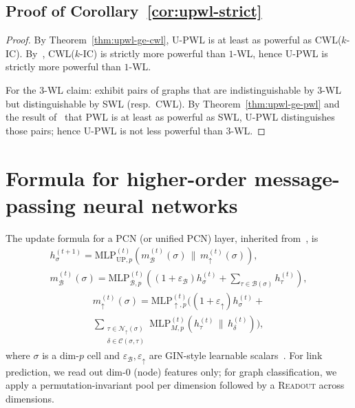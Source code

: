 \documentclass{article}
\begin{document}
\subsection{Proof of Corollary~\ref{cor:upwl-strict}}
\label{app:proof-corollary}
\begin{proof}
  By Theorem~\ref{thm:upwl-ge-cwl}, U-PWL is at least as powerful as CWL($k$-IC). By~\citet{bodnar_weisfeiler_2022}, CWL($k$-IC) is strictly more powerful than $1$-WL, hence U-PWL is strictly more powerful than $1$-WL.

  For the $3$-WL claim: \citet{bodnar_weisfeiler_2021, bodnar_weisfeiler_2022} exhibit pairs of graphs that are indistinguishable by $3$-WL but distinguishable by SWL (resp.\ CWL). By Theorem~\ref{thm:upwl-ge-pwl} and the result of~\citet{truong_weisfeiler_2024} that PWL is at least as powerful as SWL, U-PWL distinguishes those pairs; hence U-PWL is not less powerful than $3$-WL.
\end{proof}

\section{Formula for higher-order message-passing neural networks}
\label{app:formula-mp}
The update formula for a PCN (or unified PCN) layer, inherited from~\citet{bodnar_weisfeiler_2021, bodnar_weisfeiler_2022, truong_weisfeiler_2024}, is
\begin{gather*}
  h_\sigma^{(t+1)} = \mathrm{MLP}_{\mathrm{UP}, p}^{(t)}\left( m_\mathcal{B}^{(t)}(\sigma) \,\|\, m_\uparrow^{(t)}(\sigma) \right), \\
  m_\mathcal{B}^{(t)}(\sigma) = \mathrm{MLP}_{\mathcal{B}, p}^{(t)}\left( (1 + \varepsilon_\mathcal{B}) h_\sigma^{(t)} + \sum_{\tau \in \mathcal{B}(\sigma)} h_\tau^{(t)} \right),
\end{gather*}
\begin{equation*}
  \begin{aligned}
    m_\uparrow^{(t)}(\sigma) = \mathrm{MLP}_{\uparrow, p}^{(t)}\Bigg( (1 + \varepsilon_\uparrow) h_\sigma^{(t)} + \\
    \sum_{\substack{\tau \in \mathcal{N}_\uparrow(\sigma) \\ \delta \in \mathcal{C}(\sigma, \tau)}} \mathrm{MLP}_{M, p}^{(t)}\left( h_\tau^{(t)} \,\|\, h_\delta^{(t)} \right) \Bigg),
  \end{aligned}
\end{equation*}
where $\sigma$ is a dim-$p$ cell and $\varepsilon_\mathcal{B}, \varepsilon_\uparrow$ are GIN-style learnable scalars~\citep{xu_how_2019}. For link prediction, we read out dim-$0$ (node) features only; for graph classification, we apply a permutation-invariant pool per dimension followed by a \textsc{Readout} across dimensions.
\end{document}
